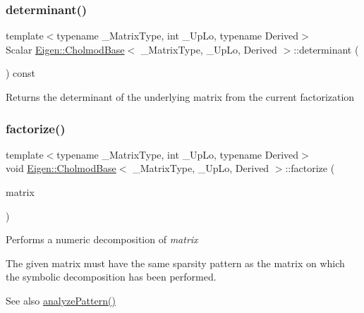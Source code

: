 \subsubsection{\texorpdfstring{determinant()}{determinant()}}
{\footnotesize\ttfamily template$<$typename \+\_\+\+Matrix\+Type, int \+\_\+\+Up\+Lo, typename Derived$>$ \\
Scalar \mbox{\hyperlink{class_eigen_1_1_cholmod_base}{Eigen\+::\+Cholmod\+Base}}$<$ \+\_\+\+Matrix\+Type, \+\_\+\+Up\+Lo, Derived $>$\+::determinant (\begin{DoxyParamCaption}{ }\end{DoxyParamCaption}) const\hspace{0.3cm}{\ttfamily [inline]}}

\begin{DoxyReturn}{Returns}
the determinant of the underlying matrix from the current factorization 
\end{DoxyReturn}
\mbox{\label{class_eigen_1_1_cholmod_base_a5bd9c9ec4d1c15f202a6c66b5e9ef37b}} 
\subsubsection{\texorpdfstring{factorize()}{factorize()}}
{\footnotesize\ttfamily template$<$typename \+\_\+\+Matrix\+Type, int \+\_\+\+Up\+Lo, typename Derived$>$ \\
void \mbox{\hyperlink{class_eigen_1_1_cholmod_base}{Eigen\+::\+Cholmod\+Base}}$<$ \+\_\+\+Matrix\+Type, \+\_\+\+Up\+Lo, Derived $>$\+::factorize (\begin{DoxyParamCaption}\item[{const Matrix\+Type \&}]{matrix }\end{DoxyParamCaption})\hspace{0.3cm}{\ttfamily [inline]}}

Performs a numeric decomposition of {\itshape matrix} 

The given matrix must have the same sparsity pattern as the matrix on which the symbolic decomposition has been performed.

\begin{DoxySeeAlso}{See also}
\mbox{\hyperlink{class_eigen_1_1_cholmod_base_a5ac967e9f4ccfc43ca9e610b89232c24}{analyze\+Pattern()}} 
\end{DoxySeeAlso}
\mbox{\label{class_eigen_1_1_cholmod_base_ada4cc43c64767d186fcb8997440cc753}} 
